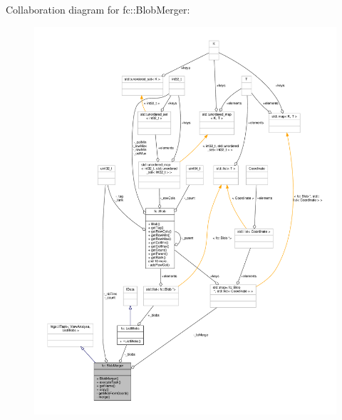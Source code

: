 Collaboration diagram for fc\+:\+:Blob\+Merger\+:
\nopagebreak
\begin{figure}[H]
\begin{center}
\leavevmode
\includegraphics[width=350pt]{dd/d0c/classfc_1_1BlobMerger__coll__graph}
\end{center}
\end{figure}
